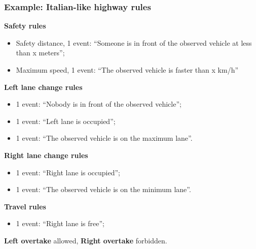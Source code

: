 \documentclass{beamer}
\begin{document}
\begin{frame}
\frametitle{Example: Italian-like highway rules}
\textbf{Safety rules}\\
\begin{itemize}
\item Safety distance, 1 event: ``Someone is in front of the observed vehicle at less than x meters'';
\item Maximum speed, 1 event: ``The observed vehicle is faster than x km/h''
\end{itemize}

\textbf{Left lane change rules}
\begin{itemize}
\item 1 event: ``Nobody is in front of the observed vehicle'';
\item 1 event: ``Left lane is occupied'';
\item 1 event: ``The observed vehicle is on the maximum lane''.
\end{itemize}

\textbf{Right lane change rules}
\begin{itemize}
\item 1 event: ``Right lane is occupied'';
\item 1 event: ``The observed vehicle is on the minimum lane''.
\end{itemize}

\textbf{Travel rules}
\begin{itemize}
\item 1 event: ``Right lane is free'';
\end{itemize}

\textbf{Left overtake} allowed, \textbf{Right overtake} forbidden.

\end{frame}
\end{document}
